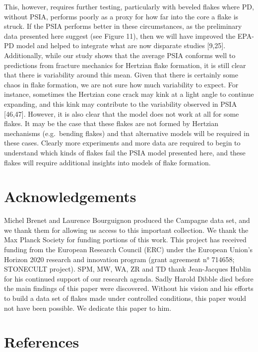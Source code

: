 \documentclass[10pt,letterpaper]{article}
\begin{document}
This, however, requires further testing, particularly with beveled
flakes where PD, without PSIA, performs poorly as a proxy for how far
into the core a flake is struck. If the PSIA performs better in these
circumstances, as the preliminary data presented here suggest (see
Figure 11), then we will have improved the EPA-PD model and helped to
integrate what are now disparate studies {[}9,25{]}. Additionally, while
our study shows that the average PSIA conforms well to predictions from
fracture mechanics for Hertzian flake formation, it is still clear that
there is variability around this mean. Given that there is certainly
some chaos in flake formation, we are not sure how much variability to
expect. For instance, sometimes the Hertzian cone crack may kink at a
light angle to continue expanding, and this kink may contribute to the
variability observed in PSIA {[}46,47{]}. However, it is also clear that
the model does not work at all for some flakes. It may be the case that
these flakes are not formed by Hertzian mechanisms (e.g.~bending flakes)
and that alternative models will be required in these cases. Clearly
more experiments and more data are required to begin to understand which
kinds of flakes fail the PSIA model presented here, and these flakes
will require additional insights into models of flake formation.

\hypertarget{acknowledgements}{%
\section{Acknowledgements}\label{acknowledgements}}

Michel Brenet and Laurence Bourguignon produced the Campagne data set,
and we thank them for allowing us access to this important collection.
We thank the Max Planck Society for funding portions of this work. This
project has received funding from the European Research Council (ERC)
under the European Union's Horizon 2020 research and innovation program
(grant agreement n° 714658; STONECULT project). SPM, MW, WA, ZR and TD
thank Jean-Jacques Hublin for his continued support of our research
agenda. Sadly Harold Dibble died before the main findings of this paper
were discovered. Without his vision and his efforts to build a data set
of flakes made under controlled conditions, this paper would not have
been possible. We dedicate this paper to him.

\hypertarget{references}{%
\section*{References}\label{references}}
\end{document}
